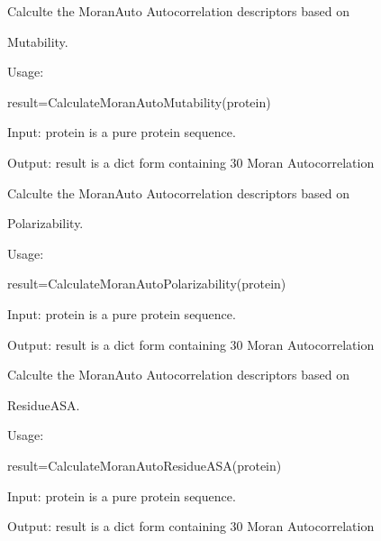 \documentclass[letterpaper,10pt,english]{sphinxmanual}
\begin{document}

\begin{fulllineitems}
\label{reference/Autocorrelation:Autocorrelation.CalculateMoranAutoMutability}
Calculte the MoranAuto Autocorrelation descriptors based on

Mutability.

Usage:

result=CalculateMoranAutoMutability(protein)

Input: protein is a pure protein sequence.

Output: result is a dict form containing 30 Moran Autocorrelation

\end{fulllineitems}


\begin{fulllineitems}
\label{reference/Autocorrelation:Autocorrelation.CalculateMoranAutoPolarizability}
Calculte the MoranAuto Autocorrelation descriptors based on

Polarizability.

Usage:

result=CalculateMoranAutoPolarizability(protein)

Input: protein is a pure protein sequence.

Output: result is a dict form containing 30 Moran Autocorrelation

\end{fulllineitems}


\begin{fulllineitems}
\label{reference/Autocorrelation:Autocorrelation.CalculateMoranAutoResidueASA}
Calculte the MoranAuto Autocorrelation descriptors based on

ResidueASA.

Usage:

result=CalculateMoranAutoResidueASA(protein)

Input: protein is a pure protein sequence.

Output: result is a dict form containing 30 Moran Autocorrelation

\end{fulllineitems}
\end{document}
